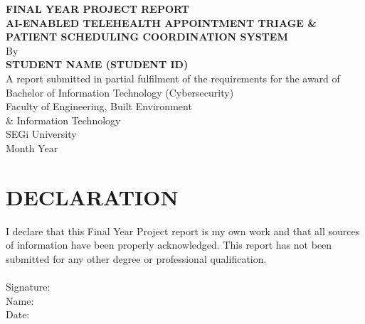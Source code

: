 \documentclass[12pt,a4paper]{report}
\begin{document}
\begin{titlepage}
    \centering
    \vspace*{2cm}
    
    \Huge \textbf{FINAL YEAR PROJECT REPORT} \\
    \vspace{1cm}
    \Large \textbf{AI-ENABLED TELEHEALTH APPOINTMENT TRIAGE \& PATIENT SCHEDULING COORDINATION SYSTEM} \\
    
    \vspace{2cm}
    \large By \\
    \textbf{STUDENT NAME (STUDENT ID)} \\
    
    \vspace{2cm}
    A report submitted in partial fulfilment of the requirements for the award of \\
    Bachelor of Information Technology (Cybersecurity) \\
    
    \vspace{2cm}
    Faculty of Engineering, Built Environment \\
    \& Information Technology \\
    SEGi University \\
    \vspace{1cm}
    Month Year
    
    \vfill
\end{titlepage}

\chapter*{DECLARATION}
I declare that this Final Year Project report is my own work and that all sources of information have been properly acknowledged. This report has not been submitted for any other degree or professional qualification. \\
\vspace{2cm} \\
Signature: \hrulefill \\
Name: \hrulefill \\
Date: \hrulefill \\
\end{document}
